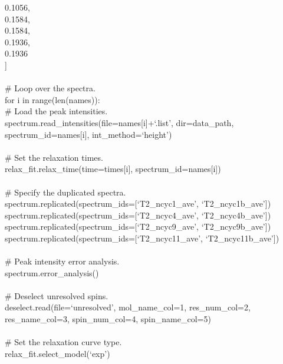 \begin{exampleenv}
\hspace*{4ex} 0.1056, \\
\hspace*{4ex} 0.1584, \\
\hspace*{4ex} 0.1584, \\
\hspace*{4ex} 0.1936, \\
\hspace*{4ex} 0.1936 \\
] \\
 \\
\# Loop over the spectra. \\
for i in range(len(names)): \\
\hspace*{4ex} \# Load the peak intensities. \\
\hspace*{4ex} spectrum.read\_intensities(file=names[i]+`.list', dir=data\_path, spectrum\_id=names[i], int\_method=`height') \\
 \\
\hspace*{4ex} \# Set the relaxation times. \\
\hspace*{4ex} relax\_fit.relax\_time(time=times[i], spectrum\_id=names[i]) \\
 \\
\# Specify the duplicated spectra. \\
spectrum.replicated(spectrum\_ids=[`T2\_ncyc1\_ave', `T2\_ncyc1b\_ave']) \\
spectrum.replicated(spectrum\_ids=[`T2\_ncyc4\_ave', `T2\_ncyc4b\_ave']) \\
spectrum.replicated(spectrum\_ids=[`T2\_ncyc9\_ave', `T2\_ncyc9b\_ave']) \\
spectrum.replicated(spectrum\_ids=[`T2\_ncyc11\_ave', `T2\_ncyc11b\_ave']) \\
 \\
\# Peak intensity error analysis. \\
spectrum.error\_analysis() \\
 \\
\# Deselect unresolved spins. \\
deselect.read(file=`unresolved', mol\_name\_col=1, res\_num\_col=2, res\_name\_col=3, spin\_num\_col=4, spin\_name\_col=5) \\
 \\
\# Set the relaxation curve type. \\
relax\_fit.select\_model(`exp') \\

\end{exampleenv}
